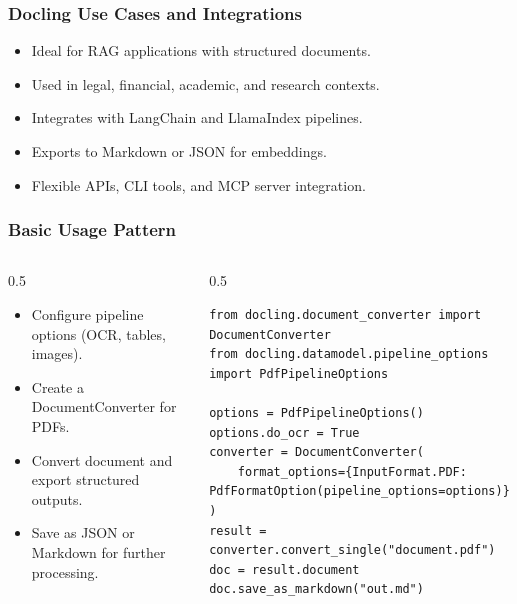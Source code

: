 \begin{frame}[fragile]\frametitle{Docling Use Cases and Integrations}
      \begin{itemize}
        \item Ideal for RAG applications with structured documents.
        \item Used in legal, financial, academic, and research contexts.
        \item Integrates with LangChain and LlamaIndex pipelines.
        \item Exports to Markdown or JSON for embeddings.
        \item Flexible APIs, CLI tools, and MCP server integration.
      \end{itemize}
\end{frame}

\begin{frame}[fragile]\frametitle{Basic Usage Pattern}
\begin{columns}
    \begin{column}[T]{0.5\linewidth}
      \begin{itemize}
        \item Configure pipeline options (OCR, tables, images).
        \item Create a DocumentConverter for PDFs.
        \item Convert document and export structured outputs.
        \item Save as JSON or Markdown for further processing.
      \end{itemize}
    \end{column}
    \begin{column}[T]{0.5\linewidth}
      \begin{lstlisting}
from docling.document_converter import DocumentConverter
from docling.datamodel.pipeline_options import PdfPipelineOptions

options = PdfPipelineOptions()
options.do_ocr = True
converter = DocumentConverter(
    format_options={InputFormat.PDF: PdfFormatOption(pipeline_options=options)}
)
result = converter.convert_single("document.pdf")
doc = result.document
doc.save_as_markdown("out.md")
      \end{lstlisting}
    \end{column}
  \end{columns}
\end{frame}

